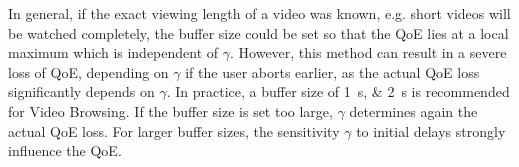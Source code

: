 In general, if the exact viewing length of a video was known, e.g. short videos will be watched completely, the buffer size could be set so that the \gls{QoE} lies at a local maximum which is independent of \(\gamma\).
However, this method can result in a severe loss of \gls{QoE}, depending on \(\gamma\) if the user aborts earlier, as the actual \gls{QoE} loss significantly depends on \(\gamma\). 
In practice, a buffer size of \SIlist{1;2}{\second} is recommended for Video Browsing. 
If the buffer size is set too large, \(\gamma\) determines again the actual \gls{QoE} loss.
For larger buffer sizes, the sensitivity \(\gamma\) to initial delays strongly influence the \gls{QoE}.